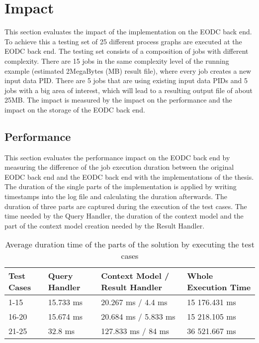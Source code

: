 \documentclass[draft,final]{vutinfth} %
\begin{document}
\section{Impact}\label{Evaluation:impact}

This section evaluates the impact of the implementation on the EODC back end. To achieve this a testing set of 25 different process graphs are executed at the EODC back end. The testing set consists of a composition of jobs with different complexity. There are 15 jobs in the same complexity level of the running example (estimated 2MegaBytes (MB) result file), where every job creates a new input data PID. There are 5 jobs that are using existing input data PIDs and 5 jobs with a big area of interest, which will lead to a resulting output file of about 25MB. The impact is measured by the impact on the performance and the impact on the storage of the EODC back end.           

\subsection{Performance}\label{Evaluation:impact_perf}
This section evaluates the performance impact on the EODC back end by measuring the difference of the job execution duration between the original EODC back end and the EODC back end with the implementations of the thesis. The duration of the single parts of the implementation is applied by writing timestamps into the log file and calculating the duration afterwards. The duration of three parts are captured during the execution of the test cases. The time needed by the Query Handler, the duration of the context model and the part of the context model creation needed by the Result Handler.   

\begin{table}[]
	\caption{Average duration time of the parts of the solution by executing the test cases}
	\centering
	\begin{tabular}{l|l|l|l}
		\textbf{Test Cases} & \textbf{Query Handler} & \textbf{Context Model / Result Handler} & \textbf{ Whole Execution Time} \\ \hline
		1-15 & 15.733 ms & 20.267 ms / 4.4 ms & 15 176.431 ms \\ 
		16-20 & 15.674 ms & 20.684 ms / 5.833 ms & 15 218.105 ms \\ 
		21-25 & 32.8 ms & 127.833 ms / 84 ms & 36 521.667 ms \\ 
	\end{tabular}
	\label{Tab:eva_performance}
\end{table}
\end{document}
